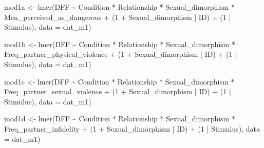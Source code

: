 \documentclass[
  bookmarksnumbered]{article}
\newenvironment{Shaded}{\begin{snugshade}}{\end{snugshade}}
\newcommand{\AttributeTok}[1]{\textcolor[rgb]{0.80,0.80,0.80}{#1}}
\newcommand{\DecValTok}[1]{\textcolor[rgb]{0.86,0.86,0.80}{#1}}
\newcommand{\FunctionTok}[1]{\textcolor[rgb]{0.94,0.94,0.56}{#1}}
\newcommand{\NormalTok}[1]{\textcolor[rgb]{0.80,0.80,0.80}{#1}}
\newcommand{\OtherTok}[1]{\textcolor[rgb]{0.94,0.94,0.56}{#1}}
\newcommand{\SpecialCharTok}[1]{\textcolor[rgb]{0.86,0.64,0.64}{#1}}
\begin{document}
\begin{Shaded}
\begin{Highlighting}[]
\NormalTok{mod1a }\OtherTok{\textless{}{-}} \FunctionTok{lmer}\NormalTok{(DFF }\SpecialCharTok{\textasciitilde{}}
\NormalTok{                Condition }\SpecialCharTok{*}\NormalTok{ Relationship }\SpecialCharTok{*}\NormalTok{ Sexual\_dimorphism }\SpecialCharTok{*}\NormalTok{ Men\_perceived\_as\_dangerous }\SpecialCharTok{+}
\NormalTok{                (}\DecValTok{1} \SpecialCharTok{+}\NormalTok{ Sexual\_dimorphism }\SpecialCharTok{|}\NormalTok{ ID) }\SpecialCharTok{+}\NormalTok{ (}\DecValTok{1} \SpecialCharTok{|}\NormalTok{ Stimulus), }
              \AttributeTok{data =}\NormalTok{ dat\_m1)}

\NormalTok{mod1b }\OtherTok{\textless{}{-}} \FunctionTok{lmer}\NormalTok{(DFF }\SpecialCharTok{\textasciitilde{}}
\NormalTok{                Condition }\SpecialCharTok{*}\NormalTok{ Relationship }\SpecialCharTok{*}\NormalTok{ Sexual\_dimorphism }\SpecialCharTok{*}\NormalTok{ Freq\_partner\_physical\_violence }\SpecialCharTok{+}
\NormalTok{                (}\DecValTok{1} \SpecialCharTok{+}\NormalTok{ Sexual\_dimorphism }\SpecialCharTok{|}\NormalTok{ ID) }\SpecialCharTok{+}\NormalTok{ (}\DecValTok{1} \SpecialCharTok{|}\NormalTok{ Stimulus), }
              \AttributeTok{data =}\NormalTok{ dat\_m1)}

\NormalTok{mod1c }\OtherTok{\textless{}{-}} \FunctionTok{lmer}\NormalTok{(DFF }\SpecialCharTok{\textasciitilde{}}
\NormalTok{                Condition }\SpecialCharTok{*}\NormalTok{ Relationship }\SpecialCharTok{*}\NormalTok{ Sexual\_dimorphism }\SpecialCharTok{*}\NormalTok{ Freq\_partner\_sexual\_violence }\SpecialCharTok{+}
\NormalTok{                (}\DecValTok{1} \SpecialCharTok{+}\NormalTok{ Sexual\_dimorphism }\SpecialCharTok{|}\NormalTok{ ID) }\SpecialCharTok{+}\NormalTok{ (}\DecValTok{1} \SpecialCharTok{|}\NormalTok{ Stimulus), }
              \AttributeTok{data =}\NormalTok{ dat\_m1)}

\NormalTok{mod1d }\OtherTok{\textless{}{-}} \FunctionTok{lmer}\NormalTok{(DFF }\SpecialCharTok{\textasciitilde{}}
\NormalTok{                Condition }\SpecialCharTok{*}\NormalTok{ Relationship }\SpecialCharTok{*}\NormalTok{ Sexual\_dimorphism }\SpecialCharTok{*}\NormalTok{ Freq\_partner\_infidelity }\SpecialCharTok{+}
\NormalTok{                (}\DecValTok{1} \SpecialCharTok{+}\NormalTok{ Sexual\_dimorphism }\SpecialCharTok{|}\NormalTok{ ID) }\SpecialCharTok{+}\NormalTok{ (}\DecValTok{1} \SpecialCharTok{|}\NormalTok{ Stimulus), }
              \AttributeTok{data =}\NormalTok{ dat\_m1)}


\end{Highlighting}
\end{Shaded}
\end{document}
